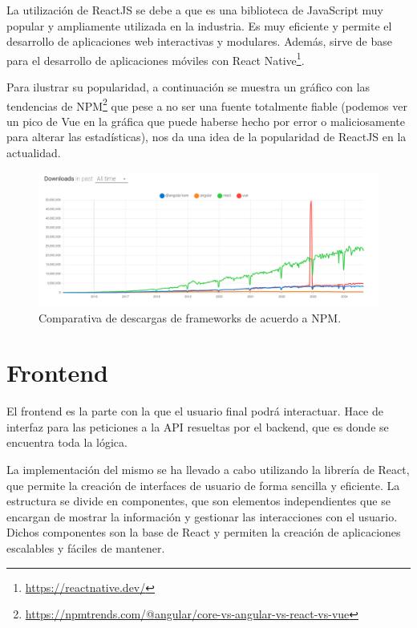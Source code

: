 La utilización de ReactJS se debe a que es una biblioteca de JavaScript muy popular y ampliamente utilizada en la industria. Es muy eficiente y permite el desarrollo de aplicaciones web interactivas y modulares. Además, sirve de base para el desarrollo de aplicaciones móviles con React Native\footnote{\url{https://reactnative.dev/}}.\newline

Para ilustrar su popularidad, a continuación se muestra un gráfico con las tendencias de NPM\footnote{\url{https://npmtrends.com/@angular/core-vs-angular-vs-react-vs-vue}} que pese a no ser una fuente totalmente fiable (podemos ver un pico de Vue en la gráfica que puede haberse hecho por error o maliciosamente para alterar las estadísticas), nos da una idea de la popularidad de ReactJS en la actualidad.

\begin{figure}[H]
    \centering
    \includegraphics[width=1\textwidth]{./imagenes/Comparativa.png}
    \caption{Comparativa de descargas de frameworks de acuerdo a NPM.}
\end{figure}




\section{Frontend}

El frontend es la parte con la que el usuario final podrá interactuar. Hace de interfaz para las peticiones a la API resueltas por el backend, que es donde se encuentra toda la lógica.\newline

La implementación del mismo se ha llevado a cabo utilizando la librería de React, que permite la creación de interfaces de usuario de forma sencilla y eficiente. La estructura se divide en componentes, que son elementos independientes que se encargan de mostrar la información y gestionar las interacciones con el usuario. Dichos componentes son la base de React y permiten la creación de aplicaciones escalables y fáciles de mantener.\newline

